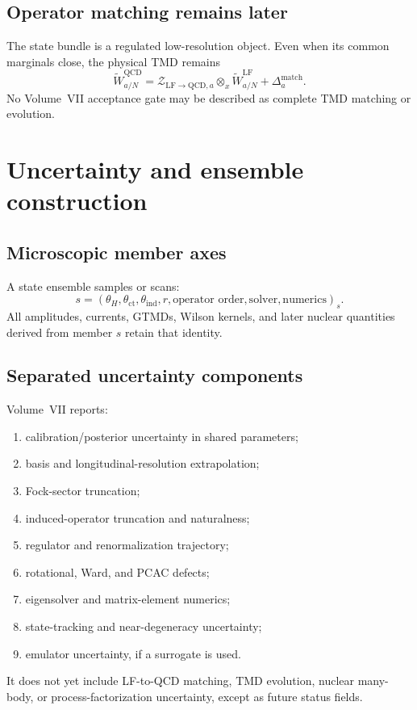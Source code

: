 \documentclass[11pt]{article}
\newcommand{\LF}{\ensuremath{\mathrm{LF}}}
\newcommand{\QCD}{\ensuremath{\mathrm{QCD}}}
\newcommand{\cZ}{\mathcal Z}
\newcommand{\ind}{\mathrm{ind}}
\newcommand{\ct}{\mathrm{ct}}
\begin{document}
\subsection{Operator matching remains later}

The state bundle is a regulated low-resolution object.  Even when its common
marginals close, the physical TMD remains
\begin{equation}
 \widetilde W_{a/N}^{\QCD}
 =\cZ_{\LF\to\QCD,a}
 \otimes_x
 \widetilde W_{a/N}^{\LF}
 +\Delta_{a}^{\mathrm{match}}.
 \label{eq:later-matching}
\end{equation}
No Volume~VII acceptance gate may be described as complete TMD matching or
evolution.

\section{Uncertainty and ensemble construction}
\label{sec:uncertainty}

\subsection{Microscopic member axes}

A state ensemble samples or scans:
\begin{equation}
 s=\left(
 \theta_H,\theta_{\ct},\theta_{\ind},
 r,\text{operator order},\text{solver},\text{numerics}
 \right)_s.
 \label{eq:member-id}
\end{equation}
All amplitudes, currents, GTMDs, Wilson kernels, and later nuclear quantities
derived from member \(s\) retain that identity.

\subsection{Separated uncertainty components}

Volume~VII reports:
\begin{enumerate}
 \item calibration/posterior uncertainty in shared parameters;
 \item basis and longitudinal-resolution extrapolation;
 \item Fock-sector truncation;
 \item induced-operator truncation and naturalness;
 \item regulator and renormalization trajectory;
 \item rotational, Ward, and PCAC defects;
 \item eigensolver and matrix-element numerics;
 \item state-tracking and near-degeneracy uncertainty;
 \item emulator uncertainty, if a surrogate is used.
\end{enumerate}
It does not yet include LF-to-QCD matching, TMD evolution, nuclear many-body,
or process-factorization uncertainty, except as future status fields.
\end{document}
